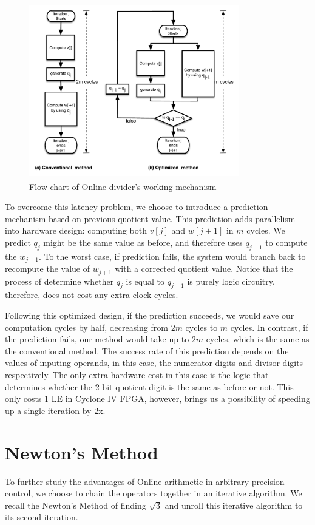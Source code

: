 \documentclass{sig-alternate}
\begin{document}
  	\begin{figure} [ht]
  		\centering
  		\includegraphics[height=3in,width=3.6in]{flowchart}
  		\caption{Flow chart of Online divider's working mechanism}
  	\end{figure}

  	
  To overcome this latency problem, we choose to introduce a prediction mechanism based on previous quotient value. This prediction adds parallelism into hardware design: computing both $v[j]$ and $w[j+1]$ in $m$ cycles. We predict $q_{j}$ might be the same value as before, and therefore uses $q_{j-1}$ to compute the $w_{j+1}$. To the worst case, if prediction fails, the system would branch back to recompute the value of $w_{j+1}$ with a corrected quotient value. Notice that the process of determine whether $q_{j}$ is equal to $q_{j-1}$ is purely logic circuitry, therefore, does not cost any extra clock cycles. 
  
  Following this optimized design, if the prediction succeeds, we would save our computation cycles by half, decreasing from $2m$ cycles to $m$ cycles. In contrast, if the prediction fails, our method would take up to $2m$ cycles, which is the same as the conventional method. The success rate of this prediction depends on the values of inputing operands, in this case, the numerator digits and divisor digits respectively. The only extra hardware cost in this case is the logic that determines whether the 2-bit quotient digit is the same as before or not. This only costs 1 LE in Cyclone IV FPGA, however, brings us a possibility of speeding up a single iteration by 2x. 
  
  \section{Newton's Method}   
  To further study the advantages of Online arithmetic in arbitrary precision control, we choose to chain the operators together in an iterative algorithm. We recall the Newton's Method of finding $\sqrt{3}$ and unroll this iterative algorithm to its second iteration.
    
\end{document}
